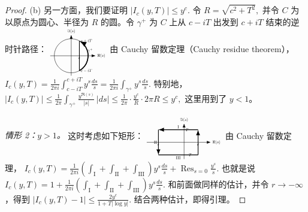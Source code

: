 \begin{proof}
	(b) 另一方面，我们要证明
	\(\textstyle |I_c(y,\allowbreak{}T)|\leq\allowbreak{} y^c.\)
	令
	\(\textstyle R=\allowbreak{}\sqrt{c^2+\allowbreak{}T^2},\allowbreak{}\)
	并令 $C$ 为以原点为圆心、半径为 $R$ 的圆。令 $\gamma^+$ 为 $C$ 上从 $c-iT$ 出发到 $c+iT$ 结束的逆时针路径：
	\(\textstyle \begin{tikzpicture}[baseline={(current bounding box.center)}, scale=0.49, transform shape, >=Latex, x=1cm, y=1cm] \draw[->] (-1.8,0) -- (2.1,0) node[right] {$\Re(s)$}; \draw[->] (0,-1.7) -- (0,1.8) node[above] {$\Im(s)$}; \draw[thin] (0,0) circle (1.45); \draw[thick] (0.7,-1.27) -- (0.7,1.27); \draw[very thick, ->] (0.7,-1.27) arc[start angle=-61,end angle=61,radius=1.45]; \node[right] at (0.7,1.27) {$c+iT$}; \node[right] at (0.7,-1.27) {$c-iT$}; \node[right] at (1.28,0.45) {$\gamma^+$}; \node[below] at (0.7,0) {$c$}; \end{tikzpicture}\)
	由 Cauchy 留数定理（Cauchy residue theorem），
	\(\textstyle I_c(y,\allowbreak{}T) =\allowbreak{} \frac1{2\pi i}\int_{c-iT}^{c+\allowbreak{}iT}y^s\frac{ds}{s} =\allowbreak{} \frac1{2\pi i}\int_{\gamma^+\allowbreak{}}y^s\frac{ds}{s}.\)
	特别地，
	\(\textstyle |I_c(y,\allowbreak{}T)| \leq\allowbreak{} \frac1{2\pi}\int_{\gamma^+\allowbreak{}}\frac{y^{\Re(s)}}{|s|}\,|ds| \leq\allowbreak{} \frac1{2\pi}\cdot \frac{y^c}{R}\cdot 2\pi R \leq\allowbreak{} y^c,\allowbreak{}\)
	这里用到了 $y<1$。

	\emph{情形 2：$y>1$。} 这时考虑如下矩形：
	\(\textstyle \begin{tikzpicture}[baseline={(current bounding box.center)}, scale=0.49, transform shape, >=Latex, x=1cm, y=0.9cm] \draw[->] (-3.2,0) -- (2.3,0) node[right] {$\Re(s)$}; \draw[->] (0,-1.6) -- (0,1.8) node[above] {$\Im(s)$}; \draw[thick, ->] (1.2,-1.2) -- (1.2,1.2); \draw[thick, ->] (1.2,1.2) -- (-2.2,1.2); \draw[thick, ->] (-2.2,1.2) -- (-2.2,-1.2); \draw[thick] (-2.2,-1.2) -- (1.2,-1.2); \node[below] at (1.2,0) {$c$}; \node[below] at (-2.2,0) {$r$}; \node[right] at (0,1.2) {$T$}; \node[right] at (0,-1.2) {$-T$}; \node[above] at (-0.5,1.2) {I}; \node[left] at (-2.2,0) {II}; \node[below] at (-0.5,-1.2) {III}; \end{tikzpicture}\)
	由 Cauchy 留数定理，
	\(\textstyle I_c(y,\allowbreak{}T) =\allowbreak{} \frac1{2\pi i} \left( \int_{\mathrm I} +\allowbreak{} \int_{\mathrm{II}} +\allowbreak{} \int_{\mathrm{III}} \right)y^s\frac{ds}{s} +\allowbreak{} \operatorname{Res}_{s=\allowbreak{}0}\frac{y^s}{s}.\)
	也就是说
	\(\textstyle I_c(y,\allowbreak{}T) =\allowbreak{} 1+\allowbreak{} \frac1{2\pi i} \left( \int_{\mathrm I} +\allowbreak{} \int_{\mathrm{II}} +\allowbreak{} \int_{\mathrm{III}} \right)y^s\frac{ds}{s}.\)
	和前面做同样的估计，并令 $r\to-\infty$，得到
	\(\textstyle |I_c(y,\allowbreak{}T)-1| \leq\allowbreak{} \frac{2y^c}{1+\allowbreak{}T|\log y|}.\)
	结合两种估计，即得引理。
\end{proof}

